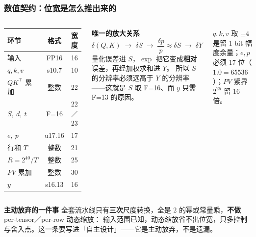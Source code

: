 \documentclass[10pt,aspectratio=43,mathserif]{beamer}
\begin{document}
\begin{frame}[t]
\frametitle{\textbf{数值契约：位宽是怎么推出来的}}
\begin{columns}[t,onlytextwidth]
  \scriptsize
  \begin{center}
  \begin{tabular}{lcc}
    \toprule
    环节 & 格式 & 宽度 \\
    \midrule
    输入 & FP16 & 16 \\
    $q,k,v$ & s10.7 & 10 \\
    $QK^{\top}$ 累加 & 整数 & 22 \\
    $S,\ d,\ t$ & F=16 & 22／23 \\
    $e,\ p$ & u17.16 & 17 \\
    行和 $T$ & 整数 & 21 \\
    $R=2^{40}/T$ & 整数 & 25 \\
    $PV$ 累加 & 整数 & 30 \\
    $y$ & s16.13 & 16 \\
    \bottomrule
  \end{tabular}
  \end{center}
  \scriptsize
  \textbf{唯一的放大关系}
  \[
    \delta(Q,K)\;\to\;\delta S\;\to\;\frac{\delta p}{p}\approx\delta S\;\to\;\delta Y
  \]
  量化误差进 $S$，$\exp$ 把它变成\textbf{相对}误差，再经加权求和进 $Y$。
  所以 $S$ 的分辨率必须远高于 $Y$ 的分辨率——这就是 $S$ 取 F=16、而 $y$ 只需 F=13 的原因。
  \vspace{0.5mm}

  {\tiny $q,k,v$ 取 $\pm4$ 是留 1 bit 幅度余量；$e,p$ 必须 17 位（$1.0=65536$）；$PV$ 紧界 $2^{25}$ 留 16 倍。}
\end{columns}
\vspace{1mm}
\begin{block}{\textbf{\scriptsize 主动放弃的一件事}}
  \scriptsize
  全套流水线只有\textbf{三次}尺度转换，全是 2 的幂或常量乘，\textbf{不做} per-tensor／per-row 动态缩放：
  输入范围已知，动态缩放省不出位宽，只多控制与舍入点。这一条要写进「自主设计」——它是主动放弃，不是遗漏。
\end{block}
\end{frame}
\end{document}
